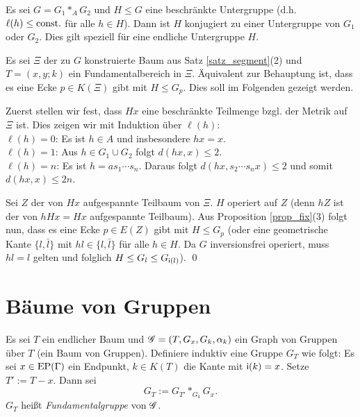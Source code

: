 \documentclass[a4paper, 12pt, twoside]{article}
\begin{document}
\FOLG Es sei $G=G_1 *_A G_2$ und $H\leq G$ eine beschränkte
Untergruppe (d.h. $\ell(h)\leq \mathrm{const.}$ für alle $h\in H$).
Dann ist $H$ konjugiert zu einer Untergruppe von $G_1$ oder $G_2$.
Dies gilt speziell für eine endliche Untergruppe $H$.

\bew Es sei $\Xi$ der zu $G$ konstruierte Baum aus Satz
\ref{satz_segment}(2) und $T=(x,y;k)$ ein 
Fundamentalbereich in $\Xi$.
Äquivalent zur Behauptung ist, dass es eine Ecke $p\in K(\Xi)$
gibt mit $H\leq G_p$. Dies soll im Folgenden gezeigt werden.

Zuerst stellen wir fest, dass $Hx$ eine beschränkte Teilmenge
bzgl. der Metrik auf $\Xi$ ist. Dies zeigen wir mit Induktion über
$\ell(h)$:\\
$\ell(h)=0$: Es ist $h\in A$ und insbesondere $hx=x$.\\
$\ell(h)=1$: Aus $h\in G_1 \cup G_2$ folgt $d(hx,x)\leq 2$.\\
$\ell(h)=n$: Es ist $h=a s_1 \cdots s_n$. Daraus folgt
$d(hx,s_2\cdots s_n x)\leq 2$ und somit $d(hx,x)\leq 2n$.

Sei $Z$ der von $Hx$ aufgespannte Teilbaum von $\Xi$.
$H$ operiert auf $Z$ (denn $hZ$ ist der von $hHx=Hx$ aufgespannte
Teilbaum).
Aus Proposition \ref{prop_fix}(3) folgt nun, dass es eine Ecke
$p\in E(Z)$ gibt mit $H\leq G_p$ (oder eine geometrische Kante
$\{l,\bar{l}\}$ mit $hl\in\{l,\bar{l}\}$ für alle $h\in H$.
Da $G$ inversionsfrei operiert, muss $hl=l$ gelten und
folglich $H\leq G_l \leq G_{\mathsf{i}(l)}$).
\qed

\section{Bäume von Gruppen}\label{sec_BvG}

\DEF Es sei $T$ ein endlicher Baum und
$\mathscr{G}=(T,G_x,G_k,\alpha_k)$ ein Graph von Gruppen über $T$
(ein \glqq Baum von Gruppen\grqq).
Definiere induktiv eine Gruppe $G_T$ wie folgt:
Es sei $x\in \mathrm{EP}(\Gamma)$ ein Endpunkt, $k\in K(T)$ die Kante mit
$\mathsf{i}(k)=x$. Setze $T':= T-x$. Dann sei
\[
G_T := G_{T'} *_{G_k} G_x.
\]
$G_T$ heißt \emph{Fundamentalgruppe}
von $\mathscr{G}$.
\end{document}
